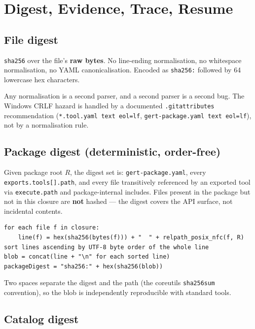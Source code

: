 \section{Digest, Evidence, Trace, Resume}
\label{sec:tool-package-digest}

\subsection{File digest}

\texttt{sha256} over the file's \textbf{raw bytes}. No line-ending
normalisation, no whitespace normalisation, no YAML canonicalisation.
Encoded as \texttt{sha256:} followed by 64 lowercase hex characters.

Any normalisation is a second parser, and a second parser is a second bug.
The Windows CRLF hazard is handled by a documented \texttt{.gitattributes}
recommendation (\texttt{*.tool.yaml text eol=lf}, \texttt{gert-package.yaml
text eol=lf}), not by a normalisation rule.

\subsection{Package digest (deterministic, order-free)}

Given package root $R$, the digest set is: \texttt{gert-package.yaml}, every
\texttt{exports.tools[].path}, and every file transitively referenced by an
exported tool via \texttt{execute.path} and package-internal includes. Files
present in the package but not in this closure are \textbf{not} hashed ---
the digest covers the API surface, not incidental contents.

\begin{verbatim}
for each file f in closure:
    line(f) = hex(sha256(bytes(f))) + "  " + relpath_posix_nfc(f, R)
sort lines ascending by UTF-8 byte order of the whole line
blob = concat(line + "\n" for each sorted line)
packageDigest = "sha256:" + hex(sha256(blob))
\end{verbatim}

Two spaces separate the digest and the path (the coreutils
\texttt{sha256sum} convention), so the blob is independently reproducible
with standard tools.

\subsection{Catalog digest}

